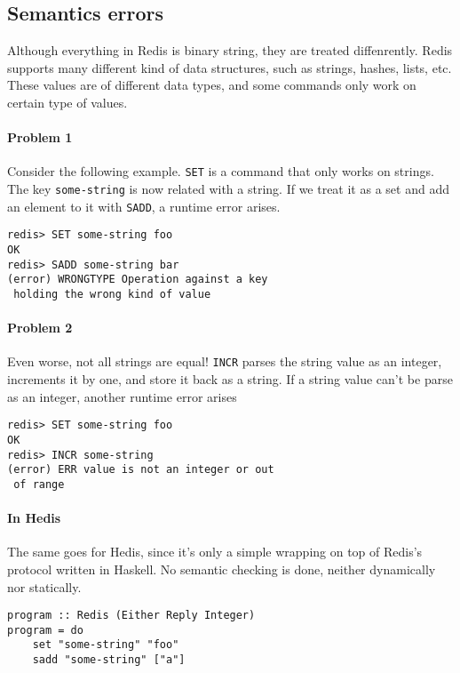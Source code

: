 \documentclass[pldi]{sigplanconf-pldi16}
\begin{document}
\subsection{Semantics errors}

Although everything in Redis is binary string, they are treated diffenrently.
Redis supports many different kind of data structures, such as strings, hashes,
 lists, etc. These values are of different data types, and some commands only
 work on certain type of values.

\paragraph{Problem 1} Consider the following example. \texttt{SET} is a command that only
works on strings. The key \texttt{some-string} is now related with a
string. If we treat it as a set and add an element to it with
\texttt{SADD}, a runtime error arises.

\begin{verbatim}
redis> SET some-string foo
OK
redis> SADD some-string bar
(error) WRONGTYPE Operation against a key
 holding the wrong kind of value
\end{verbatim}

\paragraph{Problem 2} Even worse, not all strings are equal! \texttt{INCR} parses the
string value as an integer, increments it by one, and store it back as a string.
If a string value can't be parse as an integer, another runtime error arises

\begin{verbatim}
redis> SET some-string foo
OK
redis> INCR some-string
(error) ERR value is not an integer or out
 of range
\end{verbatim}

\paragraph{In Hedis} The same goes for Hedis, since it's only a simple wrapping on top of Redis's
protocol written in Haskell. No semantic checking is done, neither
dynamically nor statically.

\begin{verbatim}
program :: Redis (Either Reply Integer)
program = do
    set "some-string" "foo"
    sadd "some-string" ["a"]
\end{verbatim}
\end{document}
